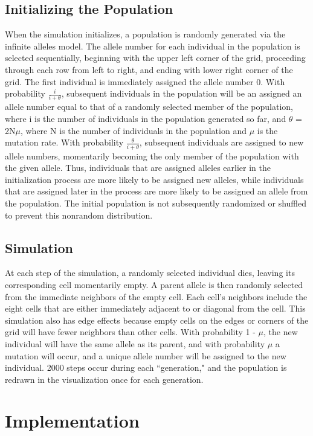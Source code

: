 \documentclass[12pt]{article}
\begin{document}
\begin{spacing}{1.6}
\subsection{Initializing the Population}
When the simulation initializes, a population is randomly generated via the infinite alleles model. The allele number for each individual in the population is selected sequentially, beginning with the upper left corner of the grid, proceeding through each row from left to right, and ending with lower right corner of the grid. The first individual is immediately assigned the allele number 0. With probability $\displaystyle \frac {i}{i + \theta}$, subsequent individuals in the population will be an assigned an allele number equal to that of a randomly selected member of the population, where i is the number of individuals in the population generated so far, and $\theta$ = 2N$\mu$, where N is the number of individuals in the population and $\mu$ is the mutation rate. With probability $\displaystyle \frac{\theta}{i + \theta}$, subsequent individuals are assigned to new allele numbers, momentarily becoming the only member of the population with the given allele. Thus, individuals that are assigned alleles earlier in the initialization process are more likely to be assigned new alleles, while individuals that are assigned later in the process are more likely to be assigned an allele from the population. The initial population is not subsequently randomized or shuffled to prevent this nonrandom distribution.

\subsection{Simulation}
At each step of the simulation, a randomly selected individual dies, leaving its corresponding cell momentarily empty. A parent allele is then randomly selected from the immediate neighbors of the empty cell. Each cell's neighbors include the eight cells that are either immediately adjacent to or diagonal from the cell. This simulation also has edge effects because empty cells on the edges or corners of the grid will have fewer neighbors than other cells. With probability 1 - $\mu$, the new individual will have the same allele as its parent, and with probability $\mu$ a mutation will occur, and a unique allele number will be assigned to the new individual. 2000 steps occur during each ``generation," and the population is redrawn in the visualization once for each generation.

\section{Implementation}


\end{spacing}
\end{document}
